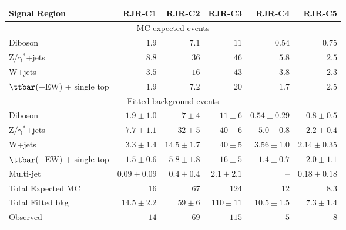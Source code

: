 \begin{table}[H]
\begin{center}
\begin{tabular}{|lrrrrr|}
\hline
Signal Region & \textbf{ RJR-C1 } & \textbf{ RJR-C2 } & \textbf{ RJR-C3 } & \textbf{ RJR-C4 } & \textbf{ RJR-C5 } \\
\hline
\multicolumn{6}{|c|}{MC expected events} \\ \hline
Diboson &  $1.9$               &  $7.1$               &  $11$               &  $0.54$               &  $0.75$               \\
$\mathrm{Z/\gamma^{*}}$+jets &  $8.8$               &  $36$               &  $46$               &  $5.8$               &  $2.5$               \\
W+jets &  $3.5$               &  $16$               &  $43$               &  $3.8$               &  $2.3$               \\
$\ttbar$(+EW) + single top &  $1.9$               &  $7.2$               &  $20$               &  $1.7$               &  $2.5$               \\
\hline
\multicolumn{6}{|c|}{Fitted background events} \\ \hline
Diboson & $1.9 \pm 1.0$ & $7 \pm 4$ & $11 \pm 6$ & $0.54 \pm 0.29$ & $0.8 \pm 0.5$ \\
$\mathrm{Z/\gamma^{*}}$+jets & $7.7 \pm 1.1$ & $32 \pm 5$ & $40 \pm 6$ & $5.0 \pm 0.8$ & $2.2 \pm 0.4$ \\
W+jets & $3.3 \pm 1.4$ & $14.5 \pm 1.7$ & $40 \pm 5$ & $3.56 \pm 1.0$ & $2.14 \pm 0.35$ \\
$\ttbar$(+EW) + single top & $1.5 \pm 0.6$ & $5.8 \pm 1.8$ & $16 \pm 5$ & $1.4 \pm 0.7$ & $2.0 \pm 1.1$ \\
Multi-jet & $0.09 \pm 0.09$ & $0.4 \pm 0.4$ & $2.1 \pm 2.1$ & -- & $0.18 \pm 0.18$ \\
\hline
Total Expected MC &  $16$               &  $67$               &  $124$               &  $12$               &  $8.3$               \\
\hline
Total Fitted bkg & $14.5 \pm 2.2$ & $59 \pm 6$ & $110 \pm 11$ & $10.5 \pm 1.5$ & $7.3 \pm 1.4$ \\
\hline
Observed &  $14$                     &  $69$                     &  $115$                     &  $5$                     &  $8$                     \\
\hline



\end{tabular}
\end{center}
\end{table}
